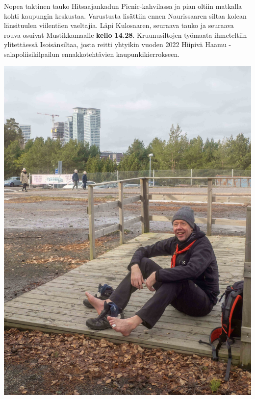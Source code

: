 \begin{multicols}{2}
	Nopea taktinen tauko Hitsaajankadun Picnic-kahvilassa ja pian oltiin
	matkalla kohti kaupungin keskustaa. Varustusta lisättiin ennen
	Naurissaaren siltaa kolean länsituulen viilentäen vaeltajia. Läpi
	Kulosaaren, seuraava tauko ja seuraava rouva osuivat Mustikkamaalle
	\textbf{kello 14.28}. Kruunusiltojen työmaata ihmeteltiin ylitettäessä
	Isoisänsiltaa, josta reitti yhtyikin vuoden 2022 Hiipivä Haamu
	-salapoliisikilpailun ennakkotehtävien kaupunkikierrokseen.

	\vspace*{0.16cm}
	\noindent\includegraphics[width=\linewidth]{assets/nahkaliljamikko}


\end{multicols}
